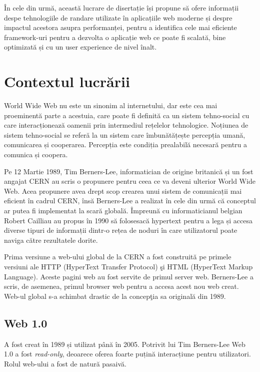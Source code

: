 \documentclass[12pt, a4paper]{report}
\begin{document}
În cele din urmă, această lucrare de disertație își propune să ofere informații despe tehnologiile de randare utilizate în aplicațiile web moderne și despre impactul acestora asupra performanței, pentru a identifica cele mai eficiente framework-uri pentru a dezvolta o aplicație web ce poate fi scalată, bine optimizată și cu un user experience de nivel înalt.


\section{Contextul lucrării}


World Wide Web nu este un sinonim al internetului, dar este cea mai proeminentă parte a acestuia, care poate fi definită ca un sistem tehno-social cu care interacționează oamenii prin intermediul rețelelor tehnologice. Noțiunea de sistem tehno-social se referă la un sistem care îmbunătățește percepția umană, comunicarea și cooperarea. Percepția este condiția prealabilă necesară pentru a comunica și coopera. \cite{theoreticalfundationsoftheweb}

Pe 12 Martie 1989, Tim Berners-Lee, informatician de origine britanică și un fost angajat CERN au scris o propunere pentru ceea ce va deveni ulterior World Wide Web. Acea propunere avea drept scop crearea unui sistem de comunicații mai eficient în cadrul CERN, însă Berners-Lee a realizat în cele din urmă că conceptul ar putea fi implementat la scară globală. Împreună cu informaticianul belgian Robert Cailliau au propus în 1990 să folosesacă hypertext pentru a lega și accesa diverse tipuri de informații dintr-o rețea de noduri în care utilizatorul poate naviga către rezultatele dorite.

Prima versiune a web-ului global de la CERN a fost construit\u a pe primele versiuni ale HTTP (HyperText Transfer Protocol) \c si HTML (HyperText Markup Language). Aceste pagini web au fost servite de primul server web. Berners-Lee a scris, de asemenea, primul browser web pentru a accesa acest nou web creat. Web-ul global s-a schimbat drastic de la concep\c tia sa original\u a din 1989.

\subsection{Web 1.0}

A fost creat în 1989 și utilizat până în 2005. Potrivit lui Tim Berners-Lee Web 1.0 a fost \emph{read-only}, deoarece oferea foarte puțină interacțiune pentru utilizatori. Rolul web-ului a fost de natură pasaivă.
\end{document}
